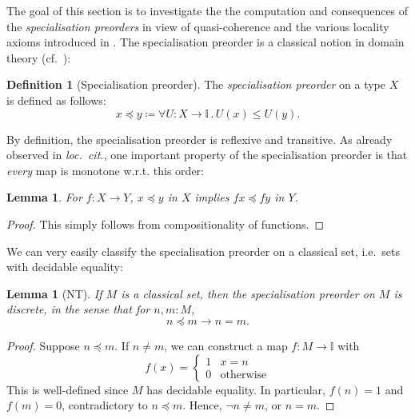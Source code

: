 \documentclass[a4paper,12pt]{amsart}
\newtheorem{lemma}[theorem]{Lemma}
\theoremstyle{definition}
\newtheorem{definition}[theorem]{Definition}
\newcommand{\mbb}[1]{\mathbb{#1}}
\newcommand{\I}{\mbb I}
\newcommand{\other}{\mathrm{otherwise}}
\newcommand{\fa}[2]{\forall #1\!\colon\!\!#2\mathpunct{.}}
\begin{document}
The goal of this section is to investigate the the computation and consequences of the \emph{specialisation preorders} in view of quasi-coherence and the various locality axioms introduced in . The specialisation preorder is a classical notion in domain theory (cf.\ \citet{PhoaWesleyKym-Son1991DtiR,hyland1990first}):

\begin{definition}[Specialisation preorder]\label{defn:specialisation}
  The \emph{specialisation preorder} on a type $X$ is defined as follows:
  \[ x \preceq y \coloneq \fa{U}{X\to\I} U(x) \le U(y). \]
\end{definition}

By definition, the specialisation preorder is reflexive and transitive. As already observed in \emph{loc.\ cit.}, one important property of the specialisation preorder is that \emph{every} map is monotone w.r.t. this order:

\begin{lemma}\label{lem:anymapmonotoneintriscorder}
  For $f \colon X \to Y$, $x \preceq y$ in $X$ implies $fx \preceq fy$ in $Y$.
\end{lemma}
\begin{proof}
  This simply follows from compositionality of functions.
\end{proof}

We can very easily classify the specialisation preorder on a classical set, i.e.\ sets with decidable equality:

\begin{lemma}[NT]\label{lem:discretephoa}
  If $M$ is a classical set, then the specialisation preorder on $M$ is discrete, in the sense that for $n,m : M$,
  \[ n \preceq m \to n = m. \]
\end{lemma}
\begin{proof}
  Suppose $n \preceq m$. If $n \neq m$, we can construct a map $f \colon M \to \I$ with 
  \[ f(x) =
  \begin{cases}
    1 & x = n \\ 
    0 & \other
  \end{cases}
  \]
  This is well-defined since $M$ has decidable equality. In particular, $f(n) = 1$ and $f(m) = 0$, contradictory to $n \preceq m$. Hence, $\neg n \neq m$, or $n = m$.
\end{proof}
\end{document}
